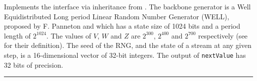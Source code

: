 
Implements the  interface via inheritance from
. The backbone generator is a Well Equidistributed
Long period Linear Random Number Generator (WELL),  proposed by F.
 Panneton\html{,} and which has a state size
of 1024 bits and a period length of 
\latex{$\rho\approx$} $2^{1024}$. The values of $V$, $W$ and $Z$ are $2^{300}$,
$2^{400}$ and $2^{700}$ respectively (see  for their
definition). The seed of the RNG, and the state of a stream at any given
step, is a 16-dimensional vector of 32-bit integers.
The output of \texttt{nextValue} has 32 bits of precision.


\bigskip\hrule

